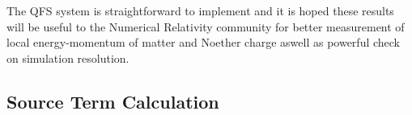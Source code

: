 The QFS system is straightforward to implement and it is hoped these results will be useful to the Numerical Relativity community for better measurement of local energy-momentum of matter and Noether charge aswell as powerful check on simulation resolution.










\subsection{Source Term Calculation} \label{q:sect:source}

